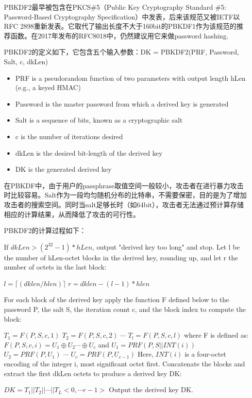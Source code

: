 \documentclass{article}
\begin{document}
PBKDF2最早被包含在PKCS\#5（Public Key Cryptography Standard \#5: Password-Based Cryptography Specification）中发表，后来该规范又被IETF以RFC 2898重新发表。它取代了输出长度不大于160bit的PBKDF1作为该规范的推荐函数。在2017年发布的RFC8018中，仍然建议用它来做password hashing.

PBKDF2的定义如下，它包含五个输入参数：\textsf{DK = PBKDF2(PRF, Password, Salt, c, dkLen)}
\begin{itemize}
\item PRF is a pseudorandom function of two parameters with output length hLen (e.g., a keyed HMAC)
\item Password is the master password from which a derived key is generated
\item Salt is a sequence of bits, known as a cryptographic salt
\item c is the number of iterations desired
\item dkLen is the desired bit-length of the derived key
\item DK is the generated derived key
\end{itemize}


在PBKDF中，由于用户的passphrase取值空间一般较小，攻击者在进行暴力攻击时比较容易。Salt作为一段均匀随机分布的比特串，不需要保密，目的是为了增加攻击者的搜索空间。同时当salt足够长时（如64bit），攻击者无法通过预计算存储相应的计算结果，从而降低了攻击的可行性。

PBKDF2的计算过程如下：

If $dkLen > (2^{32} - 1) * hLen$, output "derived key too long" and stop.
Let l be the number of hLen-octet blocks in the derived key, rounding up, and let r the number of octets in the last block:

$ l=\lceil (dklen/hlen) \rceil $  
$r=dklen -(l-1)*hlen$

For each block of the derived key apply the function F defined below to the password P, the salt S, the iteration count c, and the block index to compute the block:

$T_1=F(P,S,c,1)$
$T_2=F(P,S,c,2)$
$\cdots$
$T_l=F(P,S,c,l)$  
where F is defined as:
$F(P,S,c,i)=U_1 \oplus U_2  \cdots \oplus U_c$  
and   
$U_1=PRF(P,S||INT(i))$  
$U_2=PRF(P,U_1)$  
$\cdots$  
$U_c=PRF(P,U_{c-1})$  
Here, $INT (i)$ is a four-octet encoding of the integer i, most significant octet first.  
Concatenate the blocks and extract the first dkLen octets to produce a derived key DK:   
 
$DK=T_1||T_2||\cdots|| T_L<0,\cdots r-1>$
Output the derived key DK.
\end{document}
